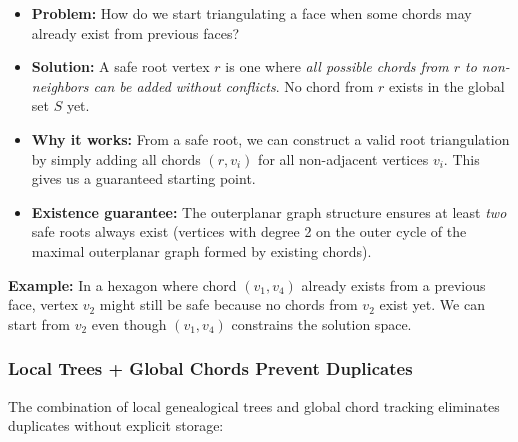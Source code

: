 \documentclass[12pt,a4paper]{article}
\theoremstyle{definition}
\theoremstyle{remark}
\begin{document}
\begin{itemize}
    \item \textbf{Problem:} How do we start triangulating a face when some chords may already exist from previous faces?
    
    \item \textbf{Solution:} A safe root vertex $r$ is one where \emph{all possible chords from $r$ to non-neighbors can be added without conflicts}. No chord from $r$ exists in the global set $S$ yet.
    
    \item \textbf{Why it works:} From a safe root, we can construct a valid root triangulation by simply adding all chords $(r, v_i)$ for all non-adjacent vertices $v_i$. This gives us a guaranteed starting point.
    
    \item \textbf{Existence guarantee:} The outerplanar graph structure ensures at least \emph{two} safe roots always exist (vertices with degree 2 on the outer cycle of the maximal outerplanar graph formed by existing chords).
\end{itemize}

\textbf{Example:} In a hexagon where chord $(v_1, v_4)$ already exists from a previous face, vertex $v_2$ might still be safe because no chords from $v_2$ exist yet. We can start from $v_2$ even though $(v_1, v_4)$ constrains the solution space.

\subsubsection{Local Trees + Global Chords Prevent Duplicates}

The combination of local genealogical trees and global chord tracking eliminates duplicates without explicit storage:
\end{document}

